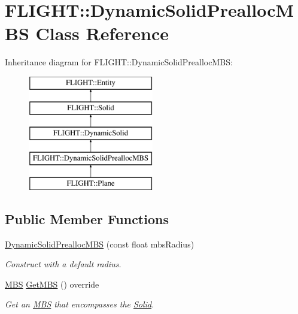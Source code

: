 \hypertarget{class_f_l_i_g_h_t_1_1_dynamic_solid_prealloc_m_b_s}{}\section{F\+L\+I\+G\+HT\+:\+:Dynamic\+Solid\+Prealloc\+M\+BS Class Reference}
\label{class_f_l_i_g_h_t_1_1_dynamic_solid_prealloc_m_b_s}
Inheritance diagram for F\+L\+I\+G\+HT\+:\+:Dynamic\+Solid\+Prealloc\+M\+BS\+:\begin{figure}[H]
\begin{center}
\leavevmode
\includegraphics[height=5.000000cm]{class_f_l_i_g_h_t_1_1_dynamic_solid_prealloc_m_b_s}
\end{center}
\end{figure}
\subsection*{Public Member Functions}
\begin{DoxyCompactItemize}
\item 
\hyperlink{class_f_l_i_g_h_t_1_1_dynamic_solid_prealloc_m_b_s_a93d8632f202492bc758f246f449264f5}{Dynamic\+Solid\+Prealloc\+M\+BS} (const float mbs\+Radius)
\begin{DoxyCompactList}\small\item\em Construct with a default radius. \end{DoxyCompactList}\item 
\hyperlink{class_f_l_i_g_h_t_1_1_m_b_s}{M\+BS} \hyperlink{class_f_l_i_g_h_t_1_1_dynamic_solid_prealloc_m_b_s_ab509519b0315831b085e5478ce6ea50f}{Get\+M\+BS} () override
\begin{DoxyCompactList}\small\item\em Get an \hyperlink{class_f_l_i_g_h_t_1_1_m_b_s}{M\+BS} that encompasses the \hyperlink{class_f_l_i_g_h_t_1_1_solid}{Solid}. \end{DoxyCompactList}\end{DoxyCompactItemize}


